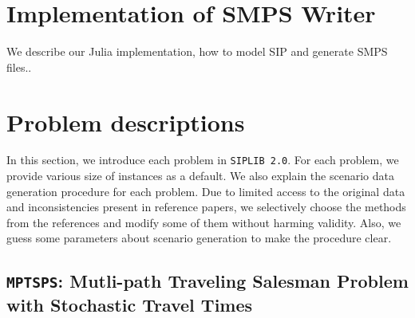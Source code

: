 \section{Implementation of SMPS Writer}

We describe our Julia implementation, how to model SIP and generate SMPS files..


\section{Problem descriptions} \label{sec:prob_desc}

In this section, we introduce each problem in \texttt{SIPLIB 2.0}.  For each problem, we provide various size of instances as a default. We also explain the scenario data generation procedure for each problem. Due to limited access to the original data and inconsistencies present in reference papers, we selectively choose the methods from the references and modify some of them without harming validity. Also, we guess some parameters about scenario generation to make the procedure clear.  %
\subsection{\texttt{MPTSPS}: Mutli-path Traveling Salesman Problem with Stochastic Travel Times}
